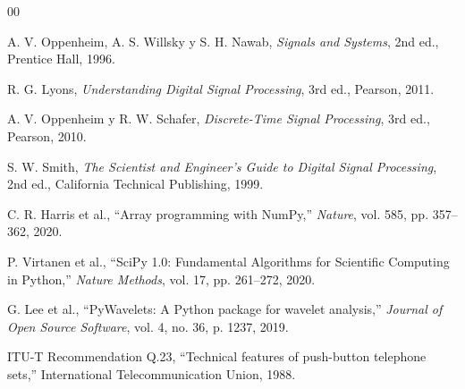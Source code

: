 
\begin{thebibliography}{00}

A. V. Oppenheim, A. S. Willsky y S. H. Nawab,
\textit{Signals and Systems},
2nd ed., Prentice Hall, 1996.

R. G. Lyons,
\textit{Understanding Digital Signal Processing},
3rd ed., Pearson, 2011.

A. V. Oppenheim y R. W. Schafer,
\textit{Discrete-Time Signal Processing},
3rd ed., Pearson, 2010.

S. W. Smith,
\textit{The Scientist and Engineer's Guide to Digital Signal Processing},
2nd ed., California Technical Publishing, 1999.

C. R. Harris et al.,
``Array programming with NumPy,''
\textit{Nature}, vol. 585, pp. 357--362, 2020.

P. Virtanen et al.,
``SciPy 1.0: Fundamental Algorithms for Scientific Computing in Python,''
\textit{Nature Methods}, vol. 17, pp. 261--272, 2020.

G. Lee et al.,
``PyWavelets: A Python package for wavelet analysis,''
\textit{Journal of Open Source Software}, vol. 4, no. 36, p. 1237, 2019.

ITU-T Recommendation Q.23,
``Technical features of push-button telephone sets,''
International Telecommunication Union, 1988.

\end{thebibliography}
